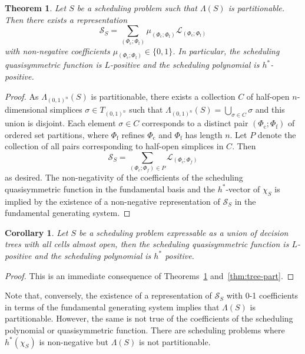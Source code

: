\documentclass[12pt,reqno]{amsart}
\numberwithin{definition}{section}
\newtheorem{theorem}[definition]{Theorem}
\newtheorem{corollary}[definition]{Corollary}
\theoremstyle{definition}
\newcommand{\SSS}{\mathcal{S}}
\newcommand{\ncL}{\mathcal{L}}
\newcommand{\T}{T} %
\newcommand{\TC}{\T_{(0,1)^n}} %
\newcommand{\allow}{\Lambda} %
\newcommand{\poly}{\chi} %
\newcommand{\allowC}{\allow_{(0,1)^n}} %
\newcommand{\comment}[1]{\textsf{\footnotesize #1}}
\begin{document}


\begin{theorem}
\label{thm:part-pos}
Let $S$ be a scheduling problem such that $\allow(S)$ is partitionable. Then there exists a representation
\[
  \SSS_S = \sum_{(\Phi_\text{c};\Phi_\text{f})} \mu_{(\Phi_\text{c};\Phi_\text{f})} \ncL_{(\Phi_\text{c};\Phi_\text{f})}
\]
with non-negative coefficients $\mu_{(\Phi_\text{c};\Phi_\text{f})}\in \{0,1\}$. In particular, 
the scheduling quasisymmetric function is $L$-positive and the scheduling polynomial is $h^*$-positive.
\end{theorem}
\begin{proof}
As $\allowC(S)$ is partitionable, there exists a collection $C$ of half-open $n$-dimensional simplices $\sigma\in\TC$ such that $\allowC(S)=\bigcup_{\sigma\in C}\sigma$ and this union is disjoint. Each element $\sigma\in C$ corresponds to a distinct pair $(\Phi_\text{c};\Phi_\text{f})$ of ordered set partitions, where $\Phi_\text{f}$ refines $\Phi_\text{c}$ and $\Phi_\text{f}$ has length $n$. Let $P$ denote the collection of all pairs corresponding to half-open simplices in $C$. Then
\[
  \SSS_S = \sum_{(\Phi_c;\Phi_f)\in P} \ncL_{(\Phi_c;\Phi_f)}
\]
as desired. The non-negativity of the coefficients of the scheduling quasisymmetric function in the fundamental basis and the $h^*$-vector of $\poly_S$ is implied by the existence of a non-negative representation of $\SSS_S$ in the fundamental generating system.
\end{proof}

\begin{corollary}
Let $S$ be a scheduling problem expressable as a union of decision trees with all cells almost open, then the scheduling quasisymmetric function is $L$-positive and the scheduling polynomial is $h^*$ positive. 
\end{corollary}
\begin{proof}
This is an immediate consequence of Theorems~\ref{thm:part-pos} and~\ref{thm:tree-part}.
\end{proof}
Note that, conversely, the existence of a representation of $\SSS_S$ with 0-1 coefficients in terms of the fundamental generating system implies that $\allow(S)$ is partitionable. However, the same is not true of the coefficients of the scheduling polynomial or quasisymmetric function.  There are scheduling problems where $h^*(\poly_S)$ is non-negative but $\allow(S)$ is not partitionable. 
\end{document}
